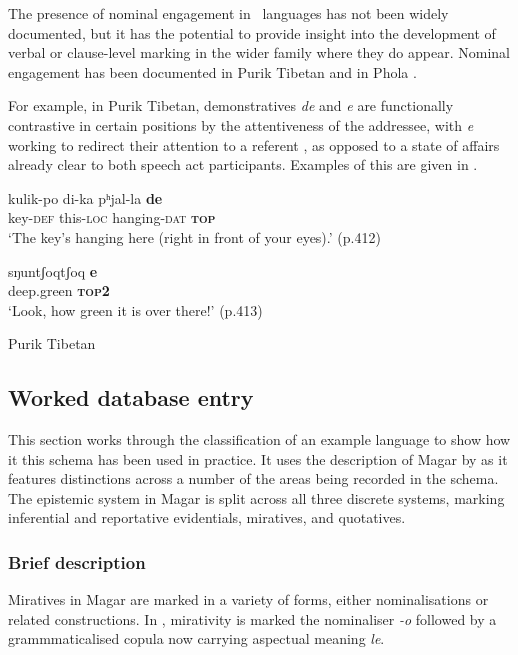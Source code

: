 The presence of nominal engagement in \lfam\ languages has not been widely documented, but it has the potential to provide insight into the development of verbal or clause-level marking in the wider family where they do appear. Nominal engagement has been documented in Purik Tibetan \cite[Tibetic: India:][]{Zemp2021} and in Phola \cite[Ngwi-Burmese, PRC:][]{GonzalezPerez2023}.

For example, in Purik Tibetan, demonstratives \textit{de} and \textit{e} are functionally contrastive in certain positions by the attentiveness of the addressee, with \textit{e} working to redirect their attention to a referent \cite{Zemp2021}, as opposed to a state of affairs already clear to both speech act participants. Examples of this are given in .

\begin{exe}
  \ex \label{e:Methods:PurikDem}
  \begin{xlist}
    \ex 
    \gll kulik-po di-ka pʰjal-la \textbf{de} \\
    key-\textsc{def} this-\textsc{loc} hanging-\textsc{dat} \textsc{\textbf{top}} \\
    \glt `The key’s hanging here (right in front of your eyes).' (p.412)

    \ex
    \gll sŋuntʃoqtʃoq \textbf{e} \\
    deep.green \textbf{\textsc{top2}} \\
    \glt `Look, how green it is over there!' (p.413)
  \end{xlist}
  Purik Tibetan \cite[Tibetic:India][]{Zemp2021}
\end{exe}

\subsection{Worked database entry}\label{ss:Methods:MagarExample}
This section works through the classification of an example language to show how it this schema has been used in practice. It uses the description of Magar by  as it features distinctions across a number of the areas being recorded in the schema. The epistemic system in Magar is split across all three discrete systems, marking inferential and reportative evidentials, miratives, and quotatives.

\subsubsection{Brief description}
Miratives in Magar are marked in a variety of forms, either nominalisations or related constructions. In , mirativity is marked the nominaliser \textit{-o} followed by a grammmaticalised copula now carrying aspectual meaning \textit{le}. 

